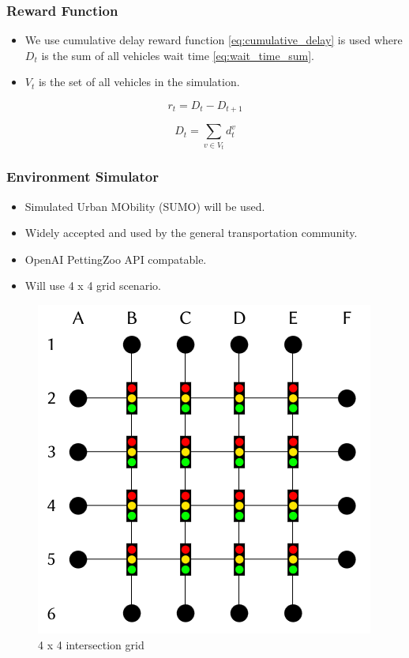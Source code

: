 \documentclass[compress,12pt]{beamer}
\begin{document}
\begin{frame}[bg=arguelles.png]
      \frametitle{Reward Function}
      \begin{itemize}
      \item We use cumulative delay reward function \ref{eq:cumulative_delay} is used where \(D_t\) is the sum of all vehicles wait time \ref{eq:wait_time_sum}.
      \item \(V_t\) is the set of all vehicles in the simulation.
      \end{itemize}

    \begin{equation}
    r_t = D_t - D_{t+1}
    \label{eq:cumulative_delay}
    \end{equation}

    \begin{equation}
    D_t = \sum_{v \in V_t} d_t^v
    \label{eq:wait_time_sum}
    \end{equation}
\end{frame}

\begin{frame}[bg=logo.png]
      \frametitle{Environment Simulator}
      \begin{itemize}
      \item Simulated Urban MObility (SUMO) will be used.
      \item Widely accepted and used by the general transportation community.
      \item OpenAI PettingZoo API compatable.
      \item Will use 4 x 4 grid scenario.
      \end{itemize}

    \begin{figure}[htbp]
      \centering
      \includegraphics[width=0.6\linewidth]{4x4.png}
      \caption{4 x 4 intersection grid}
      \label{fig:intersection_grid}
    \end{figure}

\end{frame}
\end{document}
